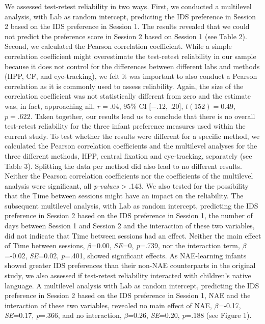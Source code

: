 \documentclass[
  english,
  man,floatsintext]{apa6}
\begin{document}
We assessed test-retest reliability in two ways. First, we conducted a multilevel analysis, with Lab as random intercept, predicting the IDS preference in Session 2 based on the IDS preference in Session 1. The results revealed that we could not predict the preference score in Session 2 based on Session 1 (see Table 2). Second, we calculated the Pearson correlation coefficient. While a simple correlation coefficient might overestimate the test-retest reliability in our sample because it does not control for the differences between different labs and methods (HPP, CF, and eye-tracking), we felt it was important to also conduct a Pearson correlation as it is commonly used to assess reliability. Again, the size of the correlation coefficient was not statistically different from zero and the estimate was, in fact, approaching nil, \(r = .04\), 95\% CI \([-.12\), \(.20]\), \(t(152) = 0.49\), \(p = .622\). Taken together, our results lead us to conclude that there is no overall test-retest reliability for the three infant preference measures used within the current study.
To test whether the results were different for a specific method, we calculated the Pearson correlation coefficients and the multilevel analyses for the three different methods, HPP, central fixation and eye-tracking, separately (see Table 3). Splitting the data per method did also lead to no different results. Neither the Pearson correlation coefficients nor the coefficients of the multilevel analysis were significant, all \emph{p-values} \textgreater{} .143.
We also tested for the possibility that the Time between sessions might have an impact on the reliability. The subsequent multilevel analysis, with Lab as random intercept, predicting the IDS preference in Session 2 based on the IDS preference in Session 1, the number of days between Session 1 and Session 2 and the interaction of these two variables, did not indicate that Time between sessions had an effect. Neither the main effect of Time between sessions, \(\beta\)=0.00, \emph{SE}=0, \emph{p}=.739, nor the interaction term, \(\beta\)=-0.02, \emph{SE}=0.02, \emph{p}=.401, showed significant effects.
As NAE-learning infants showed greater IDS preferences than their non-NAE counterparts in the original study, we also assessed if test-retest reliability interacted with children's native language. A multilevel analysis with Lab as random intercept, predicting the IDS preference in Session 2 based on the IDS preference in Session 1, NAE and the interaction of these two variables, revealed no main effect of NAE, \(\beta\)=-0.17, \emph{SE}=0.17, \emph{p}=.366, and no interaction, \(\beta\)=0.26, \emph{SE}=0.20, \emph{p}=.188 (see Figure 1).
\end{document}
